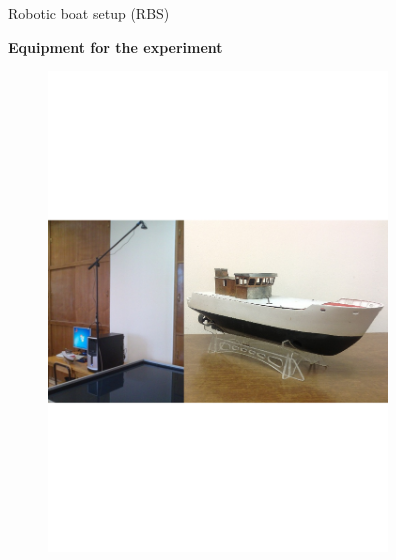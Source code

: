 \documentclass[10pt,pdf,hyperref={unicode}]{beamer}
\begin{document}
\begin{frame}{Robotic boat setup (RBS)}

\begin{center}
	{\Large \textbf {Equipment for the experiment}\\}
\end{center}

\begin{figure}
\centering
\includegraphics[width=9cm]{RBS.pdf}
\end{figure}

\centering
{}

\end{frame}
\end{document}
